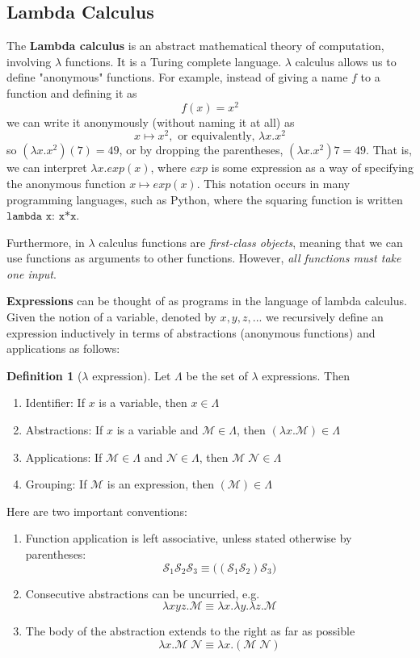 \documentclass[a4paper, 12pt]{report}
\theoremstyle{remark}
\theoremstyle{definition}
\newtheorem{definition}{Definition}[section]
\begin{document}
\subsection{Lambda Calculus}
The \textbf{Lambda calculus} is an abstract mathematical theory of computation, involving $\lambda$ functions. It is a Turing complete language. $\lambda$ calculus allows us to define "anonymous" functions. For example, instead of giving a name $f$ to a function and defining it as 
\[f(x) = x^2\]
we can write it anonymously (without naming it at all) as 
\[x \mapsto x^2, \text{ or equivalently, } \lambda x . x^2\]
so $(\lambda x.x^2) (7) = 49$, or by dropping the parentheses,  $(\lambda x.x^2) 7 = 49$. That is, we can interpret $\lambda x.exp(x)$, where $exp$ is some expression as a way of specifying the anonymous function $x \mapsto exp(x)$. This notation occurs in many programming languages, such as Python, where the squaring function is written $\texttt{lambda x: x*x}$.  

Furthermore, in $\lambda$ calculus functions are \textit{first-class objects}, meaning that we can use functions as arguments to other functions. However, \textit{all functions must take one input}. 

\textbf{Expressions} can be thought of as programs in the language of lambda calculus. Given the notion of a variable, denoted by $x, y, z, ...$ we recursively define an expression inductively in terms of abstractions (anonymous functions) and applications as follows: 

\begin{definition}[$\lambda$ expression]
Let $\Lambda$ be the set of $\lambda$ expressions. Then 
\begin{enumerate}
    \item Identifier: If $x$ is a variable, then $x \in \Lambda$ 
    \item Abstractions: If $x$ is a variable and $\mathcal{M} \in \Lambda$, then $(\lambda x.\mathcal{M}) \in \Lambda$
    \item Applications: If $\mathcal{M} \in \Lambda$ and $\mathcal{N} \in \Lambda$, then $\mathcal{M}\;\mathcal{N} \in \Lambda$
    \item Grouping: If $\mathcal{M}$ is an expression, then $( \mathcal{M}) \in \Lambda$
\end{enumerate}
Here are two important conventions: 
\begin{enumerate}
    \item Function application is left associative, unless stated otherwise by parentheses:
    \[\mathcal{S}_1 \mathcal{S}_2 \mathcal{S}_3 \equiv \big( (\mathcal{S}_1 \mathcal{S}_2) \mathcal{S}_3 \big)\]
    \item Consecutive abstractions can be uncurried, e.g. 
    \[\lambda x y z . \mathcal{M} \equiv \lambda x . \lambda y . \lambda z . \mathcal{M} \]
    \item The body of the abstraction extends to the right as far as possible 
    \[\lambda x . \mathcal{M} \; \mathcal{N} \equiv \lambda x . ( \mathcal{M}\; \mathcal{N})\]
\end{enumerate}
\end{definition}
\end{document}
